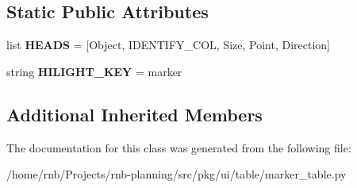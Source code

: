 \subsection*{Static Public Attributes}
\begin{DoxyCompactItemize}
\item 
\mbox{\label{classrnb-planning_1_1src_1_1pkg_1_1ui_1_1table_1_1marker__table_1_1_marker_table_a824085fa52b4756f83c7482ef6746848}} 
list {\bfseries H\+E\+A\+DS} = \mbox{[}\textquotesingle{}Object\textquotesingle{}, I\+D\+E\+N\+T\+I\+F\+Y\+\_\+\+C\+OL, \textquotesingle{}Size\textquotesingle{}, \textquotesingle{}Point\textquotesingle{}, \textquotesingle{}Direction\textquotesingle{}\mbox{]}
\item 
\mbox{\label{classrnb-planning_1_1src_1_1pkg_1_1ui_1_1table_1_1marker__table_1_1_marker_table_a460ddc0dc600bd4f91506a6b186dd587}} 
string {\bfseries H\+I\+L\+I\+G\+H\+T\+\_\+\+K\+EY} = \textquotesingle{}marker\textquotesingle{}
\end{DoxyCompactItemize}
\subsection*{Additional Inherited Members}


The documentation for this class was generated from the following file\+:\begin{DoxyCompactItemize}
\item 
/home/rnb/\+Projects/rnb-\/planning/src/pkg/ui/table/marker\+\_\+table.\+py\end{DoxyCompactItemize}
